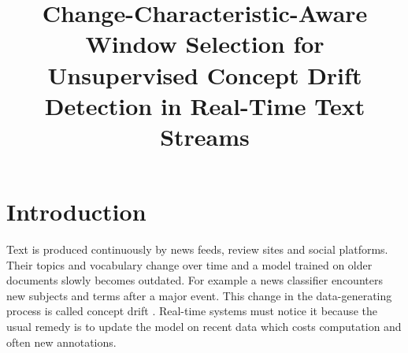 \documentclass[conference]{IEEEtran}
\begin{document}
\title{Change-Characteristic-Aware Window Selection for Unsupervised Concept Drift Detection in Real-Time Text Streams}

\makeatletter
\newcommand{\linebreakand}{\end{@IEEEauthorhalign}\hfill\mbox{}\par\mbox{}\hfill\begin{@IEEEauthorhalign}}
\makeatother


\maketitle

\section{Introduction}

Text is produced continuously by news feeds, review sites and social platforms. Their topics and vocabulary change over time and a model trained on older documents slowly becomes outdated. For example a news classifier encounters new subjects and terms after a major event. This change in the data-generating process is called concept drift \cite{gama2014,lu2019}. Real-time systems must notice it because the usual remedy is to update the model on recent data which costs computation and often new annotations.
\end{document}
